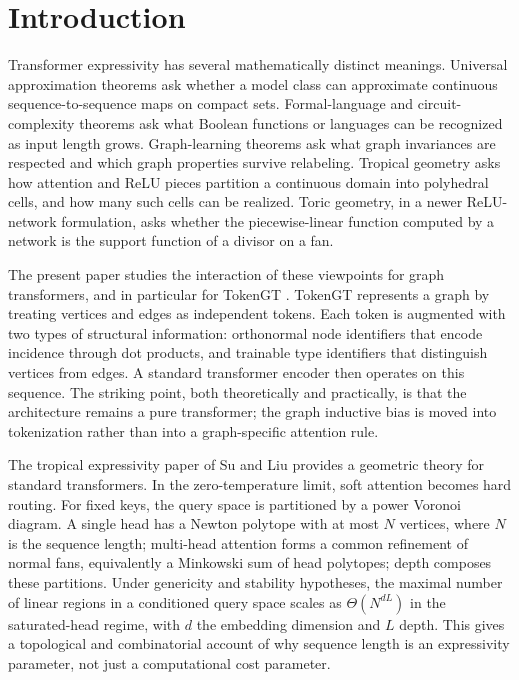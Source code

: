 \documentclass[11pt]{article}
\begin{document}
\tableofcontents
\newpage

\section{Introduction}

Transformer expressivity has several mathematically distinct meanings.  Universal approximation theorems ask whether a model class can approximate continuous sequence-to-sequence maps on compact sets.  Formal-language and circuit-complexity theorems ask what Boolean functions or languages can be recognized as input length grows.  Graph-learning theorems ask what graph invariances are respected and which graph properties survive relabeling.  Tropical geometry asks how attention and ReLU pieces partition a continuous domain into polyhedral cells, and how many such cells can be realized.  Toric geometry, in a newer ReLU-network formulation, asks whether the piecewise-linear function computed by a network is the support function of a divisor on a fan.

The present paper studies the interaction of these viewpoints for graph transformers, and in particular for TokenGT \cite{kim2022tokengt}.  TokenGT represents a graph by treating vertices and edges as independent tokens.  Each token is augmented with two types of structural information: orthonormal node identifiers that encode incidence through dot products, and trainable type identifiers that distinguish vertices from edges.  A standard transformer encoder then operates on this sequence.  The striking point, both theoretically and practically, is that the architecture remains a pure transformer; the graph inductive bias is moved into tokenization rather than into a graph-specific attention rule.

The tropical expressivity paper of Su and Liu \cite{su2026tropicalexpressivity} provides a geometric theory for standard transformers.  In the zero-temperature limit, soft attention becomes hard routing.  For fixed keys, the query space is partitioned by a power Voronoi diagram.  A single head has a Newton polytope with at most $N$ vertices, where $N$ is the sequence length; multi-head attention forms a common refinement of normal fans, equivalently a Minkowski sum of head polytopes; depth composes these partitions.  Under genericity and stability hypotheses, the maximal number of linear regions in a conditioned query space scales as $\Theta(N^{dL})$ in the saturated-head regime, with $d$ the embedding dimension and $L$ depth.  This gives a topological and combinatorial account of why sequence length is an expressivity parameter, not just a computational cost parameter.
\end{document}
